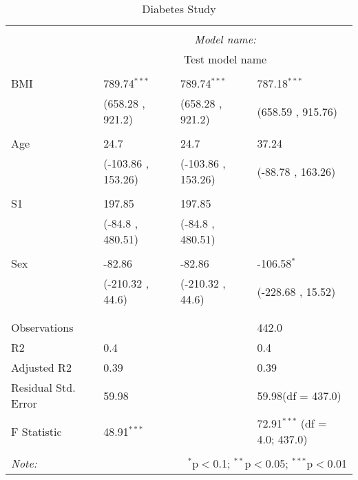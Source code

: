 \documentclass[12pt]{article}
\numberwithin{equation}{subsection}
\begin{document}
\begin{table}[!htbp] \centering
  \caption{Diabetes Study}
  \label{}
\begin{tabularx}{\textwidth}{lXXX}
\\[-1.8ex]\hline
\hline \\[-1.8ex]
& \multicolumn{3}{c}{\textit{Model name:}} \
\cr \cline{3-4}
\\[-1.8ex] & \multicolumn{3}{c}{Test model name} \\\hline \\[-1.8ex]
 BMI & 789.74$^{***}$ & 789.74$^{***}$ & 787.18$^{***}$ \\
  & (658.28 , 921.2) & (658.28 , 921.2) & (658.59 , 915.76) \\
  & & & \\
 Age & 24.7$^{}$ & 24.7$^{}$ & 37.24$^{}$ \\
  & (-103.86 , 153.26) & (-103.86 , 153.26) & (-88.78 , 163.26) \\
  & & & \\
 S1 & 197.85$^{}$ & 197.85$^{}$ & \\
  & (-84.8 , 480.51) & (-84.8 , 480.51) & \\
  & & & \\
 Sex & -82.86$^{}$ & -82.86$^{}$ & -106.58$^{*}$ \\
  & (-210.32 , 44.6) & (-210.32 , 44.6) & (-228.68 , 15.52) \\
  & & & \\
\hline \\[-1.8ex]
 Observations &   &   & 442.0 \\
 R${2}$ & 0.4 &   & 0.4 \\
 Adjusted R${2}$ & 0.39 &   & 0.39 \\
 Residual Std. Error & 59.98 &   & 59.98(df = 437.0)  \\
 F Statistic & 48.91$^{***}$  &     & 72.91$^{***}$ (df = 4.0; 437.0) \\
\hline
\hline \\[-1.8ex]
\textit{Note:} & \multicolumn{3}{r}{$^{*}$p$<$0.1; $^{**}$p$<$0.05; $^{***}$p$<$0.01} \\
\end{tabularx}
\end{table}
\end{document}

